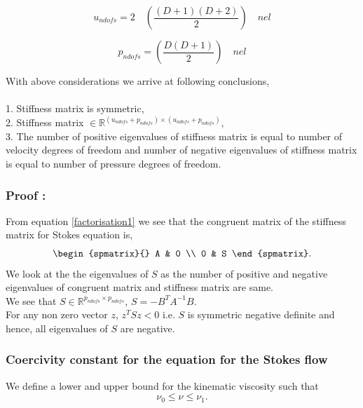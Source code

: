 \documentclass[a4paper,twoside,openright]{book}
\begin{document}
\begin{equation} \label{undofs}
u_{ndofs} = 2 \quad \left( \frac{(D+1)(D+2)}{2} \right) \quad nel
\end{equation}

\begin{equation} \label{pndofs}
p_{ndofs} = \left(\frac{D(D+1)}{2}\right) \quad nel
\end{equation}

With above considerations we arrive at following conclusions, \\
${}$\\
1. Stiffness matrix is symmetric, \\
2. Stiffness matrix $ \in \mathbb{R}^{(u_{ndofs} + p_{ndofs}) \times (u_{ndofs} + p_{ndofs})}$,\\
3. The number of positive eigenvalues of stiffness matrix is equal to number of velocity degrees of freedom and number of negative eigenvalues of stiffness matrix is equal to number of pressure degrees of freedom.\\

\subsubsection{Proof :}

From equation \eqref{factorisation1} we see that the congruent matrix of the stiffness matrix for Stokes equation is,
\begin{equation}
\begin{spmatrix}{}
    A & 0 \\
    0 & S
\end{spmatrix}
\textrm{.}
\end{equation}
We look at the the eigenvalues of $S$ as the number of positive and negative eigenvalues of congruent matrix and stiffness matrix are same.\\
We see that $S \in \mathbb{R}^{p_{ndofs} \times p_{ndofs}}$, $S = - B^T A^{-1} B$.\\ 
For any non zero vector $z$, $z^T S z < 0$ i.e. $S$ is symmetric negative definite and hence, all eigenvalues of $S$ are negative.

\subsubsection{Coercivity constant for the equation for the Stokes flow} \label{basics}

We define a lower and upper bound for the kinematic viscosity such that \\
\begin{equation}
\nu_0 \leq \nu \leq \nu_1 \textrm{.}
\end{equation}
\end{document}
